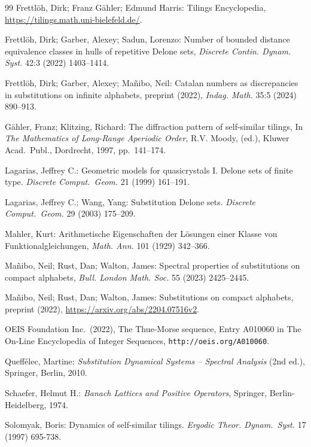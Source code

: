 \begin{thebibliography}{99}
Frettl\"oh, Dirk; Franz G\"ahler; Edmund Harris: Tilings Encyclopedia, \url{https://tilings.math.uni-bielefeld.de/}.


Frettl\"oh, Dirk; Garber, Alexey; Sadun, Lorenzo: Number of bounded distance equivalence classes in hulls of repetitive Delone sets, \emph{Discrete  Contin. Dynam. Syst.} 42:3 (2022) 1403--1414.

Frettl\"oh, Dirk; Garber, Alexey; Ma\~nibo, Neil: Catalan numbers as discrepancies in substitutions on infinite alphabets, preprint (2022), \emph{Indag. Math.} 35:5 (2024) 890--913. 


G\"ahler, Franz; Klitzing, Richard: 
The diffraction pattern of self-similar tilings, In
\emph{The Mathematics of Long-Range Aperiodic Order}, R.V. Moody, (ed.), Kluwer Acad.~Publ., Dordrecht, 1997, pp.~141--174.

Lagarias, Jeffrey C.: 
Geometric models for quasicrystals I. Delone sets of finite type. 
\emph{Discrete Comput.~Geom.} 21 (1999) 161--191.

Lagarias, Jeffrey C.; Wang, Yang: 
Substitution Delone sets.
\emph{Discrete Comput.~Geom.} 29 (2003)
175--209.


Mahler, Kurt: Arithmetische Eigenschaften der L\"osungen einer Klasse von Funktionalgleichungen, \emph{Math. Ann.} 101 (1929) 342--366.

Ma\~nibo, Neil; Rust, Dan; Walton, James: Spectral properties of substitutions on compact alphabets,  \emph{Bull. London Math. Soc.} 55 (2023) 2425--2445.

Ma\~nibo, Neil; Rust, Dan; Walton, James: Substitutions on compact alphabets, preprint (2022), \url{https://arxiv.org/abs/2204.07516v2}.

OEIS Foundation Inc.~(2022), The Thue-Morse sequence, Entry A010060 in The On-Line Encyclopedia of Integer Sequences, \texttt{http://oeis.org/A010060}.


Queffélec, Martine: 
\textit{Substitution Dynamical Systems -- Spectral Analysis}
(2nd ed.), Springer, Berlin, 2010.

Schaefer, Helmut H.: \textit{Banach Lattices and Positive Operators}, Springer, Berlin-Heidelberg, 1974. 




Solomyak, Boris: 
Dynamics of self-similar tilings. 
\emph{Ergodic Theor. Dynam.~Syst.} 17 (1997) 695-738.





%
%
%
%
%

%
%
%
%

\end{thebibliography}
